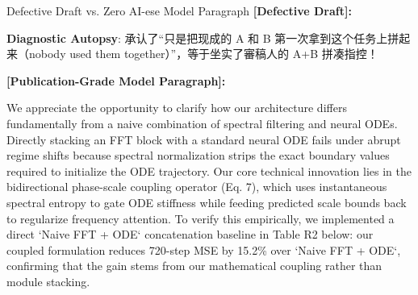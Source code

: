 \begin{ExampleBox}{Defective Draft vs. Zero AI-ese Model Paragraph}
\textbf{\color{TargetHighlight}[Defective Draft]:}\par
{}\par\vspace{4pt}
\textbf{Diagnostic Autopsy}: 承认了“只是把现成的 A 和 B 第一次拿到这个任务上拼起来（nobody used them together）”，等于坐实了審稿人的 A+B 拼凑指控！\par\vspace{6pt}
\textbf{\color{AcadNavy}[Publication-Grade Model Paragraph]:}\par
We appreciate the opportunity to clarify how our architecture differs fundamentally from a naive combination of spectral filtering and neural ODEs. Directly stacking an FFT block with a standard neural ODE fails under abrupt regime shifts because spectral normalization strips the exact boundary values required to initialize the ODE trajectory. Our core technical innovation lies in the bidirectional phase-scale coupling operator (Eq. 7), which uses instantaneous spectral entropy to gate ODE stiffness while feeding predicted scale bounds back to regularize frequency attention. To verify this empirically, we implemented a direct `Naive FFT + ODE` concatenation baseline in Table R2 below: our coupled formulation reduces 720-step MSE by 15.2\% over `Naive FFT + ODE`, confirming that the gain stems from our mathematical coupling rather than module stacking.
\end{ExampleBox}
